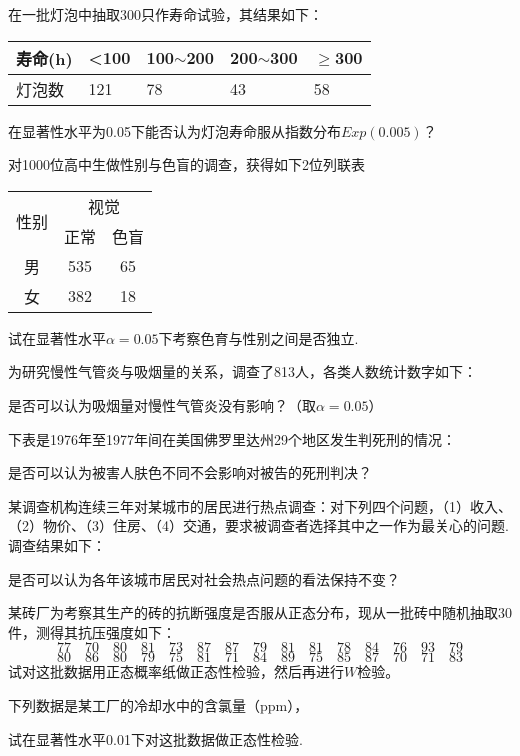 \begin{xiti}
\item 在一批灯泡中抽取300只作寿命试验，其结果如下：
\begin{table}[!htp]
	\centering
	\begin{tabularx}{1.0\textwidth}{Z|ZZZZ}
		寿命(h)&<100&100$\sim$200&200$\sim $300&$\geq $300\\
		\midrule
		灯泡数&121&78&43&58
	\end{tabularx}
\end{table}

在显著性水平为0.05下能否认为灯泡寿命服从指数分布$Exp(0.005)$？

\item 对1000位高中生做性别与色盲的调查，获得如下2位列联表
\begin{table}[!htb]
	\centering
	\begin{tabular}{c|cc}\hline
		\multirow{2}[0]{*}{性别} & \multicolumn{2}{c}{视觉} \\
		& 正常    & 色盲 \\\hline
		男     & 535   & 65 \\\hline
		女     & 382   & 18 \\\hline
	\end{tabular}
\end{table}

试在显著性水平$\alpha=0.05$下考察色育与性别之间是否独立.

\item 为研究慢性气管炎与吸烟量的关系，调查了813人，各类人数统计数字如下：

是否可以认为吸烟量对慢性气管炎没有影响？（取$\alpha=0.05$）

\item 下表是1976年至1977年间在美国佛罗里达州29个地区发生判死刑的情况：

是否可以认为被害人肤色不同不会影响对被告的死刑判决？

\item 某调查机构连续三年对某城市的居民进行热点调查：对下列四个问题，（1）收入、（2）物价、（3）住房、（4）交通，要求被调查者选择其中之一作为最关心的问题.调查结果如下：

是否可以认为各年该城市居民对社会热点问题的看法保持不变？

\item 某砖厂为考察其生产的砖的抗断强度是否服从正态分布，现从一批砖中随机抽取30件，测得其抗压强度如下：
\[77 \quad 70 \quad 80 \quad 81 \quad 73 \quad 87 \quad 87 \quad 79 \quad 81 \quad 81 \quad78 \quad 84 \quad 76 \quad 93 \quad 79\]
\[80 \quad 86 \quad 80 \quad 79 \quad 75 \quad 81 \quad 71 \quad 84 \quad 89 \quad 75 \quad 85 \quad 87 \quad 70 \quad 71 \quad 83\]
试对这批数据用正态概率纸做正态性检验，然后再进行$W$检验。

\item 下列数据是某工厂的冷却水中的含氯量（ppm），

试在显著性水平0.01下对这批数据做正态性检验.
\end{xiti}